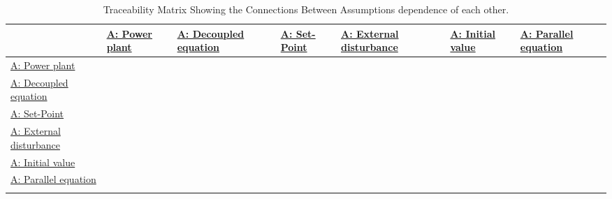 \documentclass[12pt]{article}
\begin{document}
\begin{longtable}{l l l l l l l}
\toprule
\textbf{} & \textbf{\hyperref[pwrPlant]{A: Power plant}} & \textbf{\hyperref[decoupled]{A: Decoupled equation}} & \textbf{\hyperref[setPoint]{A: Set-Point}} & \textbf{\hyperref[externalDistub]{A: External disturbance}} & \textbf{\hyperref[initialValue]{A: Initial value}} & \textbf{\hyperref[parallelEq]{A: Parallel equation}}
\\
\midrule
\endhead
\hyperref[pwrPlant]{A: Power plant} &  &  &  &  &  & 
\\
\hyperref[decoupled]{A: Decoupled equation} &  &  &  &  &  & 
\\
\hyperref[setPoint]{A: Set-Point} &  &  &  &  &  & 
\\
\hyperref[externalDistub]{A: External disturbance} &  &  &  &  &  & 
\\
\hyperref[initialValue]{A: Initial value} &  &  &  &  &  & 
\\
\hyperref[parallelEq]{A: Parallel equation} &  &  &  &  &  & 
\\
\bottomrule
\caption{Traceability Matrix Showing the Connections Between Assumptions dependence of each other.}
\label{Table:TraceMatAvsA}
\end{longtable}
\end{document}
